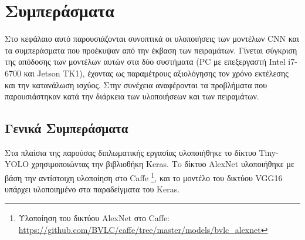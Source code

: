 \chapter{Συμπεράσματα}
\label{chapter:conclusions}

Στο κεφάλαιο αυτό παρουσιάζονται συνοπτικά οι υλοποιήσεις των μοντέλων CNN
και τα συμπεράσματα που προέκυψαν από την έκβαση των πειραμάτων.
Γίνεται σύγκριση της απόδοσης των μοντέλων αυτών στα δύο συστήματα
(PC με επεξεργαστή Intel i7-6700 και Jetson TK1), έχοντας ως
παραμέτρους αξιολόγησης τον χρόνο εκτέλεσης και την κατανάλωση ισχύος.
Στην συνέχεια αναφέρονται τα προβλήματα που παρουσιάστηκαν
κατά την διάρκεια των υλοποιήσεων και των πειραμάτων.

\section{Γενικά Συμπεράσματα}

Στα πλαίσια της παρούσας διπλωματικής εργασίας υλοποιήθηκε το δίκτυο
Tiny-YOLO χρησιμοποιώντας την βιβλιοθήκη Keras.
Τo δίκτυο AlexNet υλοποιήθηκε με βάση την αντίστοιχη υλοποίηση
στο Caffe \footnote{Υλοποίηση του δικτύου AlexNet στο Caffe: \url{https://github.com/BVLC/caffe/tree/master/models/bvlc_alexnet}},
και το μοντέλο του δικτύου VGG16 υπάρχει υλοποιημένο στα παραδείγματα του Keras.

